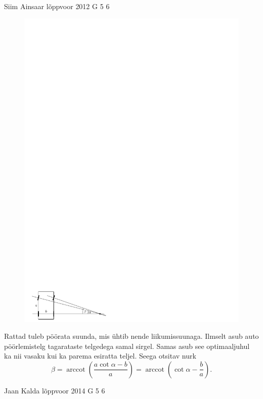 \documentclass[11pt, twoside]{article}
\begin{document}
{%
{Siim Ainsaar} %
{lõppvoor} %
{2012} %
{G 5} %
{6} %
{

\ifSolution
\begin{figure}
\includegraphics[width=\linewidth]{2012-v3g-05-r_joonis}
\end{figure}
Rattad tuleb pöörata suunda, mis ühtib nende liikumissuunaga. Ilmselt asub auto
pöörlemistelg tagarataste telgedega samal sirgel. Samas asub see optimaaljuhul
ka nii vasaku kui ka parema esiratta teljel. Seega otsitav nurk
\[
\beta =
\operatorname{arccot} \left( \frac{a \cot\alpha - b}{a} \right)
=
\operatorname{arccot} \left( \cot\alpha - \frac ba \right).
\]
\fi
}

{Jaan Kalda} %
{lõppvoor} %
{2014} %
{G 5} %
{6} %
{

}}
\end{document}
